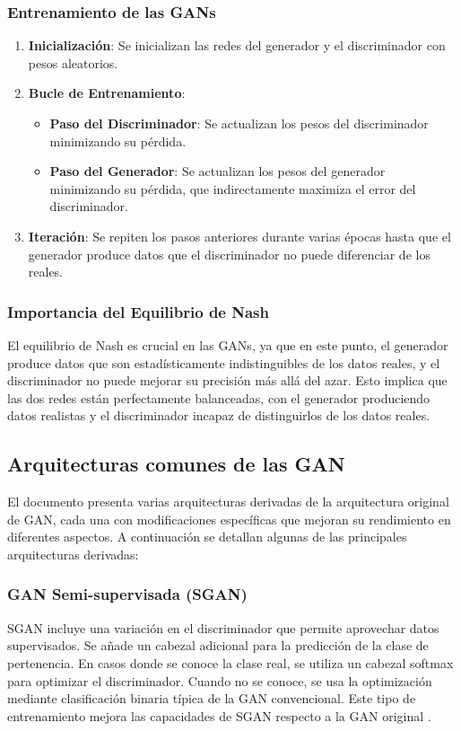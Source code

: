 \subsubsection{Entrenamiento de las GANs}

\begin{enumerate}
    \item \textbf{Inicialización}: Se inicializan las redes del generador y el discriminador con pesos aleatorios.
    \item \textbf{Bucle de Entrenamiento}:
    \begin{itemize}
        \item \textbf{Paso del Discriminador}: Se actualizan los pesos del discriminador minimizando su pérdida.
        \item \textbf{Paso del Generador}: Se actualizan los pesos del generador minimizando su pérdida, que indirectamente maximiza el error del discriminador.
    \end{itemize}
    \item \textbf{Iteración}: Se repiten los pasos anteriores durante varias épocas hasta que el generador produce datos que el discriminador no puede diferenciar de los reales.
\end{enumerate}

\subsubsection{Importancia del Equilibrio de Nash}

El equilibrio de Nash es crucial en las GANs, ya que en este punto, el generador produce datos que son estadísticamente indistinguibles de los datos reales, y el discriminador no puede mejorar su precisión más allá del azar. Esto implica que las dos redes están perfectamente balanceadas, con el generador produciendo datos realistas y el discriminador incapaz de distinguirlos de los datos reales.

\subsection{Arquitecturas comunes de las GAN}


El documento presenta varias arquitecturas derivadas de la arquitectura original de GAN, cada una con modificaciones específicas que mejoran su rendimiento en diferentes aspectos. A continuación se detallan algunas de las principales arquitecturas derivadas:

\subsubsection{GAN Semi-supervisada (SGAN)}
SGAN incluye una variación en el discriminador que permite aprovechar datos supervisados. Se añade un cabezal adicional para la predicción de la clase de pertenencia. En casos donde se conoce la clase real, se utiliza un cabezal softmax para optimizar el discriminador. Cuando no se conoce, se usa la optimización mediante clasificación binaria típica de la GAN convencional. Este tipo de entrenamiento mejora las capacidades de SGAN respecto a la GAN original \cite{sgan}.

